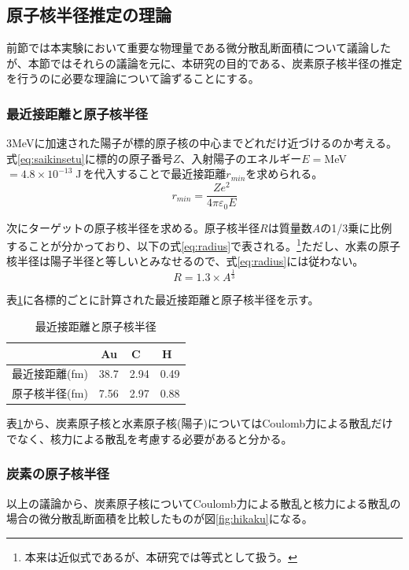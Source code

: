 \documentclass[a4paper,11pt,dvipdfmx]{jsarticle}
\begin{document}
\renewcommand\thefootnote{\arabic{footnote})}
\newpage
\subsection{原子核半径推定の理論}
前節では本実験において重要な物理量である微分散乱断面積について議論したが、本節ではそれらの議論を元に、本研究の目的である、炭素原子核半径の推定を行うのに必要な理論について論ずることにする。
\subsubsection{最近接距離と原子核半径}
3\;MeVに加速された陽子が標的原子核の中心までどれだけ近づけるのか考える。
式\eqref{eq:saikinsetu}に標的の原子番号$Z$、入射陽子のエネルギー$E=$\;MeV\;$=4.8\times10^{-13}\;$J\,を代入することで最近接距離$r_{min}$を求められる。
\begin{equation}
    r_{min}=\frac{Ze^{2}}{4\pi\varepsilon_{0}E}
    \label{eq:saikinsetu}
\end{equation}

次にターゲットの原子核半径を求める。原子核半径$R$は質量数$A$の1/3乗に比例することが分かっており、以下の式\eqref{eq:radius}で表される。\footnote{本来は近似式であるが、本研究では等式として扱う。}ただし、水素の原子核半径は陽子半径と等しいとみなせるので、式\eqref{eq:radius}には従わない。
\begin{equation}
    R=1.3\times A^{\frac{1}{3}}
    \label{eq:radius}
\end{equation}

表\ref{table:gensi}に各標的ごとに計算された最近接距離と原子核半径を示す。

\begin{table}[htbp]
 \centering
  \begin{tabular}{clll}
   \hline 
   \  & \,Au & \;\,C & \;\,H \\
   \hline \hline
   最近接距離(fm) & 38.7 & 2.94 & 0.49 \\
   原子核半径(fm) & 7.56 & 2.97 & 0.88 \\
   \hline    
  \end{tabular}
  \caption{最近接距離と原子核半径}
   \label{table:gensi}
\end{table}

表\ref{table:gensi}から、炭素原子核と水素原子核(陽子)についてはCoulomb力による散乱だけでなく、核力による散乱を考慮する必要があると分かる。

\subsubsection{炭素の原子核半径}
以上の議論から、炭素原子核についてCoulomb力による散乱と核力による散乱の場合の微分散乱断面積を比較したものが図\ref{fig:hikaku}になる。
\end{document}
